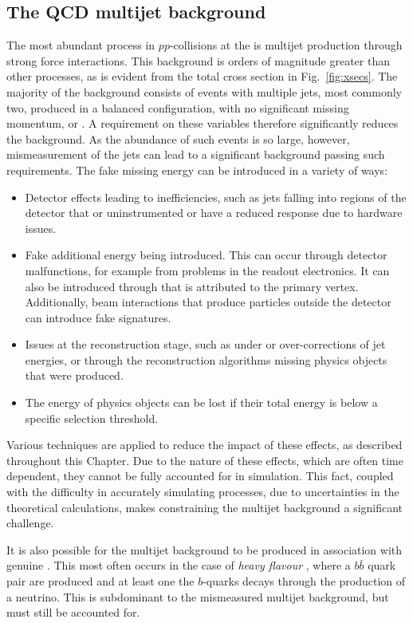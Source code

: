 \subsection{The QCD multijet background}
\label{sec:qcdMultijet}

The most abundant \SM process in $pp$-collisions at the \LHC is \QCD
multijet production through strong force interactions. This background
is orders of magnitude greater than other processes, as is evident
from the total \LHC cross section in Fig.~\ref{fig:xsecs}. The
majority of the \QCD background consists of events with multiple jets,
most commonly two, produced in a balanced configuration, with no
significant missing momentum, \MET or \MHT. A requirement on these
variables therefore significantly reduces the background. As
the abundance of such events is so large, however, mismeasurement of
the jets can lead to a significant \QCD background passing such
requirements. The fake missing energy can be introduced in a variety
of ways:
\begin{itemize}
\item{Detector effects leading to inefficiencies, such as jets
falling into regions of the detector that or uninstrumented or have a
reduced response due to hardware issues.}
\item{Fake additional energy being introduced. This can occur through
detector malfunctions, for example from problems in the readout
electronics. It can also be introduced through \PU that is attributed to
the primary vertex. Additionally, beam interactions that produce
particles outside the detector can introduce fake \MET signatures.}
\item{Issues at the reconstruction stage,
such as under or over-corrections of jet energies, or through
the reconstruction algorithms missing physics objects that were
produced.}
\item{The energy of physics objects can be lost if their total energy
is below a specific selection threshold. }
\end{itemize}

Various techniques are applied to reduce the impact of these
effects, as described throughout this Chapter. Due to the nature of
these effects, which are often time dependent, they cannot be fully
accounted for in simulation. This fact, coupled with the difficulty in
accurately simulating \QCD processes, due to uncertainties in the
theoretical calculations, makes constraining the multijet background a
significant challenge. 

It is also possible for the \QCD multijet background to be produced in
association with genuine \MET. This most often occurs in the case of
\emph{heavy flavour} \QCD, where a $b\bar{b}$ quark pair are produced
and at least one the $b$-quarks decays through the production of a
neutrino.  This is subdominant to the mismeasured multijet background,
but must still be accounted for. 

